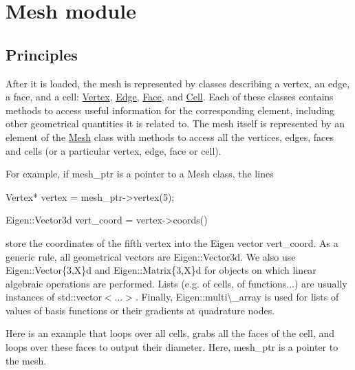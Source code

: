 \label{_mesh}%
 \hypertarget{index_mesh}{}\section{Mesh module}\label{index_mesh}
\hypertarget{index_meshpple}{}\subsection{Principles}\label{index_meshpple}
After it is loaded, the mesh is represented by classes describing a vertex, an edge, a face, and a cell\+: \hyperlink{classHArDCore3D_1_1Vertex}{Vertex}, \hyperlink{classHArDCore3D_1_1Edge}{Edge}, \hyperlink{classHArDCore3D_1_1Face}{Face}, and \hyperlink{classHArDCore3D_1_1Cell}{Cell}. Each of these classes contains methods to access useful information for the corresponding element, including other geometrical quantities it is related to. The mesh itself is represented by an element of the \hyperlink{classHArDCore3D_1_1Mesh}{Mesh} class with methods to access all the vertices, edges, faces and cells (or a particular vertex, edge, face or cell).

For example, if {\ttfamily mesh\+\_\+ptr} is a pointer to a Mesh class, the lines 
\begin{DoxyCode}
Vertex* vertex = mesh\_ptr->vertex(5);

Eigen::Vector3d vert\_coord = vertex->coords()
\end{DoxyCode}
 store the coordinates of the fifth vertex into the Eigen vector vert\+\_\+coord. As a generic rule, all geometrical vectors are {\ttfamily Eigen\+::\+Vector3d}. We also use {\ttfamily Eigen\+::\+Vector\{3,X\}d} and {\ttfamily Eigen\+::\+Matrix\{3,X\}d} for objects on which linear algebraic operations are performed. Lists (e.\+g. of cells, of functions...) are usually instances of {\ttfamily std\+::vector$<$...$>$}. Finally, {\ttfamily Eigen\+::multi\textbackslash{}\+\_\+array} is used for lists of values of basis functions or their gradients at quadrature nodes.

Here is an example that loops over all cells, grabs all the faces of the cell, and loops over these faces to output their diameter. Here, {\ttfamily mesh\+\_\+ptr} is a pointer to the mesh.


